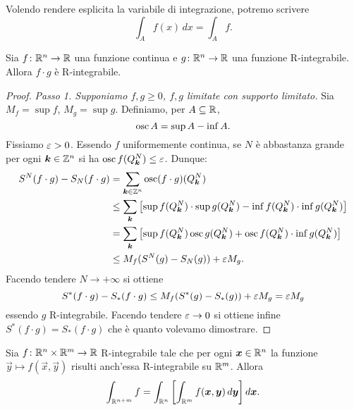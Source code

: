 Volendo rendere esplicita la variabile di integrazione, potremo 
scrivere 
\[
  \int_A f(x)\, dx = \int_A f.
\]

\begin{theorem}
Sia $f\colon {\mathbb R}^n\to {\mathbb R}$ una funzione continua e $g\colon {\mathbb R}^n\to {\mathbb R}$ 
una funzione R-integrabile. Allora $f\cdot g$ è R-integrabile.
\end{theorem}
\begin{proof}
\emph{Passo 1. Supponiamo $f,g\ge 0$, $f,g$ limitate con supporto limitato.}
Sia $M_f=\sup f$, $M_g=\sup g$.
Definiamo, per $A\subseteq {\mathbb R}$,
\[
  \operatorname{osc} A = \sup A - \inf A.
\]
Fissiamo $\varepsilon>0$.
Essendo $f$ uniformemente continua, se $N$ è abbastanza grande 
per ogni $\boldsymbol k\in {\mathbb Z}^n$ si ha $\operatorname{osc} f(Q^N_{\boldsymbol k})\le \varepsilon$.
Dunque:
\begin{align*}
S^N(f\cdot g) - S_N(f\cdot g)
&= \sum_{\boldsymbol k\in {\mathbb Z}^n} \operatorname{osc} (f\cdot g)(Q^N_{\boldsymbol k})\\
&\le \sum_{\boldsymbol k}{\left[ \sup f(Q^N_{\boldsymbol k}) \cdot \sup g(Q^N_{\boldsymbol k})
  -\inf f(Q^N_{\boldsymbol k})\cdot \inf g(Q^N_{\boldsymbol k}) \right]} \\
&= \sum_{\boldsymbol k}{\left[ \sup f(Q^N_{\boldsymbol k}) \operatorname{osc} g(Q^N_{\boldsymbol k}) 
  + \operatorname{osc} f(Q^N_{\boldsymbol k})\cdot \inf g(Q^N_{\boldsymbol k}) \right]}\\
&\le M_f (S^N(g)-S_N(g)) + \varepsilon M_g.
\end{align*}
Facendo tendere $N\to +\infty$ si ottiene 
\[
S^*(f\cdot g)- S_*(f\cdot g) 
\le M_f (S^*(g)-S_*(g)) + \varepsilon M_g = \varepsilon M_g
\]
essendo $g$ R-integrabile.
Facendo tendere $\varepsilon\to 0$ si ottiene infine $S^*(f\cdot g)=S_*(f\cdot g)$ 
che è quanto volevamo dimostrare.
\end{proof}

\begin{theorem}
Sia $f\colon {\mathbb R}^n\times {\mathbb R}^m \to {\mathbb R}$ R-integrabile
tale che per ogni $\boldsymbol x\in {\mathbb R}^n$ la funzione $\vec y \mapsto f(\vec x,\vec y)$ 
risulti anch'essa R-integrabile su ${\mathbb R}^m$.
Allora 
\[
  \int_{{\mathbb R}^{n+m}} f = \int_{{\mathbb R}^n} {\left[ \int_{{\mathbb R}^m} f(\boldsymbol x, \boldsymbol y)\, d\boldsymbol y \right]}\, d\boldsymbol x.
\]
\end{theorem}

